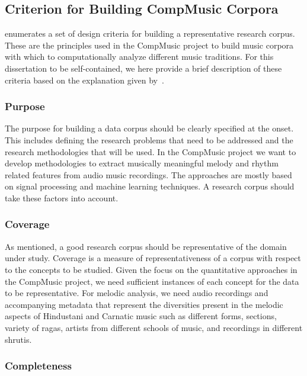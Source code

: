 \subsection{Criterion for Building CompMusic Corpora}
\label{sec:corpus_criterion_for_corpora}

\cite{serra:14:corpus} enumerates a set of design criteria for building a representative research corpus. These are the principles used in the CompMusic project to build music corpora with which to computationally analyze different music traditions. For this dissertation to be self-contained, we here provide a brief description of these criteria based on the explanation given by~\cite{serra:14:corpus}.

\subsubsection{Purpose}

The purpose for building a data corpus should be clearly specified at the onset. This includes defining the research problems that need to be addressed and the research methodologies that will be used. In the CompMusic project we want to develop methodologies to extract musically meaningful melody and rhythm related features from audio music recordings. The approaches are mostly based on signal processing and machine learning techniques. A research corpus should take these factors into account.

\subsubsection{Coverage}

As mentioned, a good research corpus should be representative of the domain under study. Coverage is a measure of representativeness of a corpus with respect to the concepts to be studied. Given the focus on the quantitative approaches in the CompMusic project, we need sufficient instances of each concept for the data to be representative. For melodic analysis, we need audio recordings and accompanying metadata that represent the diversities present in the melodic aspects of Hindustani and Carnatic music such as different forms, sections, variety of \glspl{raga}, artists from different schools of music, and recordings in different \glspl{shruti}. 

\subsubsection{Completeness}

